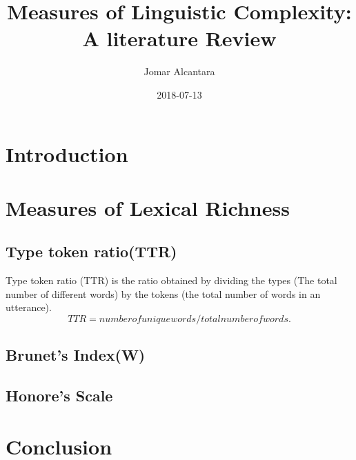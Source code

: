\documentclass[a4paper]{article}
\title{Measures of Linguistic Complexity: A literature Review}
\date{2018-07-13}
\author{Jomar Alcantara}
\begin{document}
\maketitle
\newpage
\tableofcontents
\newpage
\section{Introduction}
\section{Measures of Lexical Richness}
\subsection{Type token ratio(TTR)}
Type token ratio (TTR) is the ratio obtained by dividing the types (The total number of different words) by the tokens (the total number of words in an utterance).
\begin{equation} \label{x1}
    TTR = number of unique words / total number of words.
\end{equation}

\newline
\par
\subsection{Brunet's Index(W)}
\subsection{Honore's Scale}
\section{Conclusion}


\end{document}
